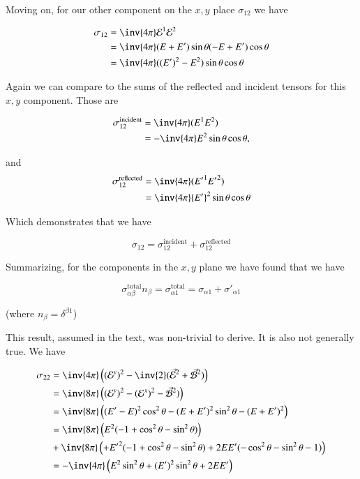 Moving on, for our other component on the $x,y$ place $\sigma_{12}$ we have

\begin{align*}
\sigma_{12} 
&= \inv{4 \pi} \mathcal{E}^1 \mathcal{E}^2 \\
&= \inv{4 \pi} (E + E') \sin\theta (-E + E') \cos\theta \\
&= \inv{4 \pi} ((E')^2 - E^2) \sin\theta \cos\theta 
\end{align*}

Again we can compare to the sums of the reflected and incident tensors for this $x,y$ component.  Those are

\begin{align*}
\sigma_{12}^{\text{incident}} 
&= 
\inv{4 \pi} ( E^1 E^2 ) \\
&= 
-\inv{4 \pi} E^2 \sin\theta \cos\theta,
\end{align*}

and
\begin{align*}
\sigma_{12}^{\text{reflected}} 
&= 
\inv{4 \pi} ( {E'}^1 {E'}^2 ) \\
&= 
\inv{4 \pi} {E'}^2 \sin\theta \cos\theta
\end{align*}

Which demonstrates that we have

\begin{equation}\label{eqn:relativisticElectrodynamicsT9:640}
\sigma_{12} = \sigma_{12}^{\text{incident}} + \sigma_{12}^{\text{reflected}} 
\end{equation}

Summarizing, for the components in the $x,y$ plane we have found that we have

\begin{equation}\label{eqn:relativisticElectrodynamicsT9:210}
\sigma_{\alpha\beta}^{\text{total}} n_\beta = \sigma_{\alpha 1 }^{\text{total}} = \sigma_{\alpha 1} + {\sigma'}_{\alpha 1}
\end{equation}

(where $n_\beta = \delta^{\beta 1}$)

This result, assumed in the text, was non-trivial to derive.  It is also not generally true.  We have 

\begin{align*}
\sigma_{2 2} 
&= \inv{4 \pi} \left( (\mathcal{E}^y)^2 - \inv{2} ( \vec{\mathcal{E}}^2 + \vec{\mathcal{B}}^2 ) \right) \\
&= \inv{8 \pi} \left( (\mathcal{E}^y)^2 - (\mathcal{E}^x)^2 - \vec{\mathcal{B}}^2 ) \right) \\
&= \inv{8 \pi} \left( 
(E' - E)^2 \cos^2\theta - (E + E')^2 \sin^2\theta - (E + E')^2
\right) \\
&= 
\inv{8 \pi} \left( 
E^2 ( -1 + \cos^2 \theta - \sin^2\theta ) 
\right) \\
&+\inv{8 \pi} \left( 
+{E'}^2 ( -1 + \cos^2 \theta - \sin^2\theta )
+ 2 E E' ( -\cos^2\theta - \sin^2\theta -1 ) \right) \\
&= -\inv{4 \pi} \left( E^2 \sin^2 \theta + (E')^2 \sin^2 \theta + 2 E E' \right)
\end{align*}

